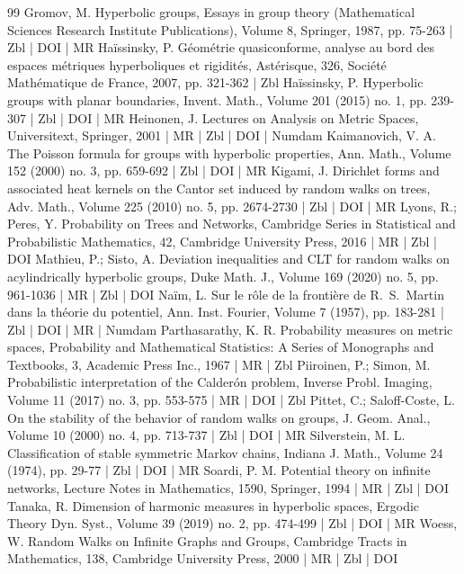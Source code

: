 \begin{thebibliography}{99}
 Gromov, M. Hyperbolic groups, Essays in group theory (Mathematical Sciences Research Institute Publications), Volume 8, Springer, 1987, pp. 75-263 | Zbl | DOI | MR
 Haïssinsky, P. Géométrie quasiconforme, analyse au bord des espaces métriques hyperboliques et rigidités, Astérisque, 326, Société Mathématique de France, 2007, pp. 321-362 | Zbl
 Haïssinsky, P. Hyperbolic groups with planar boundaries, Invent. Math., Volume 201 (2015) no. 1, pp. 239-307 | Zbl | DOI | MR
 Heinonen, J. Lectures on Analysis on Metric Spaces, Universitext, Springer, 2001 | MR | Zbl | DOI | Numdam
 Kaimanovich, V. A. The Poisson formula for groups with hyperbolic properties, Ann. Math., Volume 152 (2000) no. 3, pp. 659-692 | Zbl | DOI | MR
 Kigami, J. Dirichlet forms and associated heat kernels on the Cantor set induced by random walks on trees, Adv. Math., Volume 225 (2010) no. 5, pp. 2674-2730 | Zbl | DOI | MR
 Lyons, R.; Peres, Y. Probability on Trees and Networks, Cambridge Series in Statistical and Probabilistic Mathematics, 42, Cambridge University Press, 2016 | MR | Zbl | DOI
 Mathieu, P.; Sisto, A. Deviation inequalities and CLT for random walks on acylindrically hyperbolic groups, Duke Math. J., Volume 169 (2020) no. 5, pp. 961-1036 | MR | Zbl | DOI
 Naïm, L. Sur le rôle de la frontière de R. S. Martin dans la théorie du potentiel, Ann. Inst. Fourier, Volume 7 (1957), pp. 183-281 | Zbl | DOI | MR | Numdam
 Parthasarathy, K. R. Probability measures on metric spaces, Probability and Mathematical Statistics: A Series of Monographs and Textbooks, 3, Academic Press Inc., 1967 | MR | Zbl
 Piiroinen, P.; Simon, M. Probabilistic interpretation of the Calderón problem, Inverse Probl. Imaging, Volume 11 (2017) no. 3, pp. 553-575 | MR | DOI | Zbl
 Pittet, C.; Saloff-Coste, L. On the stability of the behavior of random walks on groups, J. Geom. Anal., Volume 10 (2000) no. 4, pp. 713-737 | Zbl | DOI | MR
 Silverstein, M. L. Classification of stable symmetric Markov chains, Indiana J. Math., Volume 24 (1974), pp. 29-77 | Zbl | DOI | MR
 Soardi, P. M. Potential theory on infinite networks, Lecture Notes in Mathematics, 1590, Springer, 1994 | MR | Zbl | DOI
 Tanaka, R. Dimension of harmonic measures in hyperbolic spaces, Ergodic Theory Dyn. Syst., Volume 39 (2019) no. 2, pp. 474-499 | Zbl | DOI | MR
 Woess, W. Random Walks on Infinite Graphs and Groups, Cambridge Tracts in Mathematics, 138, Cambridge University Press, 2000 | MR | Zbl | DOI
\end{thebibliography}
